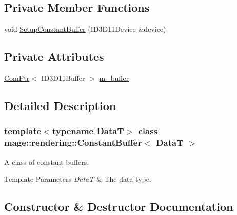 \subsection*{Private Member Functions}
\begin{DoxyCompactItemize}
\item 
void \hyperlink{classmage_1_1rendering_1_1_constant_buffer_a65ce186b87c489bd3bf4e9f7c47c5ac7}{Setup\+Constant\+Buffer} (I\+D3\+D11\+Device \&device)
\end{DoxyCompactItemize}
\subsection*{Private Attributes}
\begin{DoxyCompactItemize}
\item 
\hyperlink{namespacemage_ae74f374780900893caa5555d1031fd79}{Com\+Ptr}$<$ I\+D3\+D11\+Buffer $>$ \hyperlink{classmage_1_1rendering_1_1_constant_buffer_ae5b259b0afca9b20254735a09eccc1fc}{m\+\_\+buffer}
\end{DoxyCompactItemize}


\subsection{Detailed Description}
\subsubsection*{template$<$typename DataT$>$\newline
class mage\+::rendering\+::\+Constant\+Buffer$<$ Data\+T $>$}

A class of constant buffers.


\begin{DoxyTemplParams}{Template Parameters}
{\em DataT} & The data type. \\
\hline
\end{DoxyTemplParams}


\subsection{Constructor \& Destructor Documentation}
\hypertarget{classmage_1_1rendering_1_1_constant_buffer_a588d67fc6c3cf6317416b422d0442a5c}{}\label{classmage_1_1rendering_1_1_constant_buffer_a588d67fc6c3cf6317416b422d0442a5c} 
